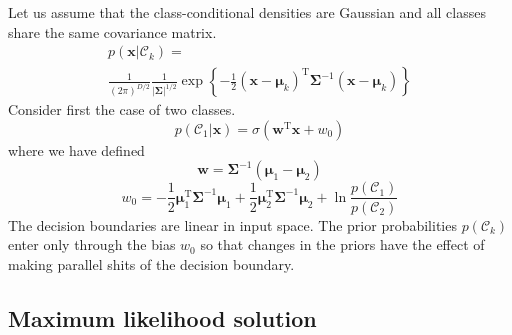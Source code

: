 \documentclass[5p,sort&compress]{elsarticle}
\begin{document}
Let us assume that the class-conditional densities are Gaussian and all classes share the same covariance matrix.
\begin{equation}
\begin{aligned}
p\left(\mathbf{x} | \mathcal{C}_{k}\right)= \\
\frac{1}{(2 \pi)^{D / 2}} \frac{1}{|\mathbf{\Sigma}|^{1 / 2}} \exp \left\{-\frac{1}{2}\left(\mathbf{x}-\boldsymbol{\mu}_{k}\right)^{\mathrm{T}} \mathbf{\Sigma}^{-1}\left(\mathbf{x}-\boldsymbol{\mu}_{k}\right)\right\}
\end{aligned}
\end{equation}
Consider first the case of two classes.
\begin{equation}
p\left(\mathcal{C}_{1} | \mathbf{x}\right)=\sigma\left(\mathbf{w}^{\mathrm{T}} \mathbf{x}+w_{0}\right)
\end{equation}
where we have defined
\begin{equation}
\mathbf{w}=\mathbf{\Sigma}^{-1}\left(\boldsymbol{\mu}_{1}-\boldsymbol{\mu}_{2}\right)
\end{equation}
\begin{equation}
w_{0}=-\frac{1}{2} \boldsymbol{\mu}_{1}^{\mathrm{T}} \mathbf{\Sigma}^{-1} \boldsymbol{\mu}_{1}+\frac{1}{2} \boldsymbol{\mu}_{2}^{\mathrm{T}} \mathbf{\Sigma}^{-1} \boldsymbol{\mu}_{2}+\ln \frac{p\left(\mathcal{C}_{1}\right)}{p\left(\mathcal{C}_{2}\right)}
\end{equation}
The decision boundaries are linear in input space. The prior probabilities $p(\mathcal{C}_k)$ enter only through the bias $w_0$ so that changes in the priors have the effect of making parallel shits of the decision boundary.


\subsection{Maximum likelihood solution}
\end{document}
